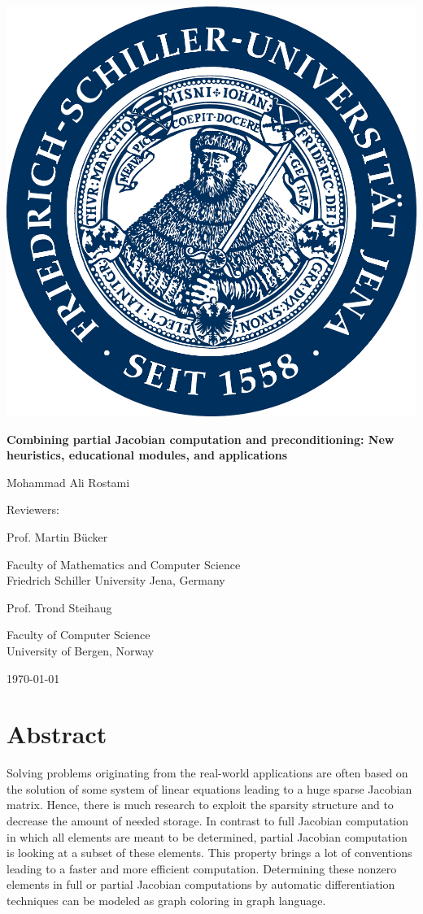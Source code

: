 \documentclass[12pt, twoside,a4paper,toc=bibliography]{scrbook}
\begin{document}
\begin{titlepage}
\centering
\includegraphics[width=0.3\linewidth]{logo}
\par
\vspace{1cm}
{\Large\textbf{Combining partial Jacobian computation and preconditioning: 
New heuristics, educational modules, and applications}\par}
\vspace{1cm}
{\Large Mohammad Ali Rostami\par}
\vspace{2cm}
{\large Reviewers:\par}
\vspace{0.6cm}
{\Large Prof. Martin B{\"u}cker\par}
{\Large Faculty of Mathematics and Computer Science\\Friedrich Schiller University Jena, Germany\par}
\vspace{1cm}
{\Large Prof. Trond Steihaug\par}
{\Large Faculty of Computer Science\\University of Bergen, Norway\par}
\vspace{1cm}
{\Large \today}
\end{titlepage}
\chapter*{Abstract}
Solving problems originating from the real-world applications are often based
on the solution of some system of linear equations leading to a huge sparse Jacobian matrix.
Hence, there
is much research to exploit the sparsity structure and to decrease the amount of needed storage. 
In contrast to full Jacobian computation in which all elements are meant to be determined, 
partial Jacobian computation is looking at a subset of these elements. This property brings a lot of conventions leading to a faster
and more efficient computation.
Determining these nonzero elements in full or partial Jacobian computations by automatic differentiation techniques
can be modeled as graph coloring in graph language.
\end{document}
